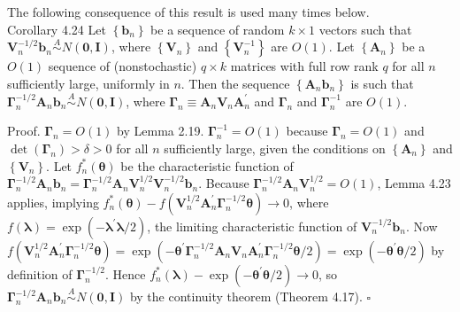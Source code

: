 \documentclass[10pt]{article}
\begin{document}
The following consequence of this result is used many times below.\\
Corollary 4.24 Let $\left\{\mathbf{b}_{n}\right\}$ be a sequence of random $k \times 1$ vectors such that $\mathbf{V}_{n}^{-1 / 2} \mathbf{b}_{n} \stackrel{A}{\sim} N(\mathbf{0}, \mathbf{I})$, where $\left\{\mathbf{V}_{n}\right\}$ and $\left\{\mathbf{V}_{n}^{-1}\right\}$ are $O(1)$. Let $\left\{\mathbf{A}_{n}\right\}$ be a $O(1)$ sequence of (nonstochastic) $q \times k$ matrices with full row rank $q$ for all $n$ sufficiently large, uniformly in $n$. Then the sequence $\left\{\mathbf{A}_{n} \mathbf{b}_{n}\right\}$ is such that $\boldsymbol{\Gamma}_{n}^{-1 / 2} \mathbf{A}_{n} \mathbf{b}_{n} \stackrel{A}{\sim} N(\mathbf{0}, \mathbf{I})$, where $\boldsymbol{\Gamma}_{n} \equiv \mathbf{A}_{n} \mathbf{V}_{n} \mathbf{A}_{n}^{\prime}$ and $\boldsymbol{\Gamma}_{n}$ and $\boldsymbol{\Gamma}_{n}^{-1}$ are $O(1)$.

Proof. $\boldsymbol{\Gamma}_{n}=O(1)$ by Lemma 2.19. $\boldsymbol{\Gamma}_{n}^{-1}=O(1)$ because $\boldsymbol{\Gamma}_{n}=O(1)$ and $\operatorname{det}\left(\boldsymbol{\Gamma}_{n}\right)>\delta>0$ for all $n$ sufficiently large, given the conditions on $\left\{\mathbf{A}_{n}\right\}$ and $\left\{\mathbf{V}_{n}\right\}$. Let $f_{n}^{*}(\boldsymbol{\theta})$ be the characteristic function of $\boldsymbol{\Gamma}_{n}^{-1 / 2} \mathbf{A}_{n} \mathbf{b}_{n}= \boldsymbol{\Gamma}_{n}^{-1 / 2} \mathbf{A}_{n} \mathbf{V}_{n}^{1 / 2} \mathbf{V}_{n}^{-1 / 2} \mathbf{b}_{n}$. Because $\boldsymbol{\Gamma}_{n}^{-1 / 2} \mathbf{A}_{n} \mathbf{V}_{n}^{1 / 2}=O(1)$, Lemma 4.23 applies, implying $f_{n}^{*}(\boldsymbol{\theta})-f\left(\mathbf{V}_{n}^{1 / 2} \mathbf{A}_{n}^{\prime} \boldsymbol{\Gamma}_{n}^{-1 / 2} \boldsymbol{\theta}\right) \rightarrow 0$, where $f(\boldsymbol{\lambda})=\exp \left(-\boldsymbol{\lambda}^{\prime} \boldsymbol{\lambda} / 2\right)$, the limiting characteristic function of $\mathbf{V}_{n}^{-1 / 2} \mathbf{b}_{n}$. Now $f\left(\mathbf{V}_{n}^{1 / 2} \mathbf{A}_{n}^{\prime} \boldsymbol{\Gamma}_{n}^{-1 / 2} \boldsymbol{\theta}\right)= \exp \left(-\boldsymbol{\theta}^{\prime} \boldsymbol{\Gamma}_{n}^{-1 / 2} \mathbf{A}_{n} \mathbf{V}_{n} \mathbf{A}_{n}^{\prime} \boldsymbol{\Gamma}_{n}^{-1 / 2} \boldsymbol{\theta} / 2\right)=\exp \left(-\boldsymbol{\theta}^{\prime} \boldsymbol{\theta} / 2\right)$ by definition of $\boldsymbol{\Gamma}_{n}^{-1 / 2}$. Hence $f_{n}^{*}(\boldsymbol{\lambda})-\exp \left(-\boldsymbol{\theta}^{\prime} \boldsymbol{\theta} / 2\right) \rightarrow 0$, so $\boldsymbol{\Gamma}_{n}^{-1 / 2} \mathbf{A}_{n} \mathbf{b}_{n} \stackrel{A}{\sim} N(\mathbf{0}, \mathbf{I})$ by the continuity theorem (Theorem 4.17). \(\square\)
\end{document}
